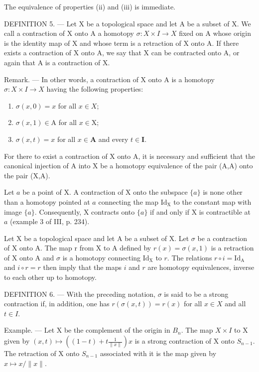 The equivalence of properties (ii) and (iii) is immediate.

DEFINITION 5. --- Let X be a topological space and let A be a subset of X. We call a contraction of X onto A a homotopy \(\sigma\colon X\times I\to X\) fixed on A whose origin is the identity map of X and whose term is a retraction of X onto A. If there exists a contraction of X onto A, we say that X can be contracted onto A, or again that A is a contraction of X.

Remark. --- In other words, a contraction of X onto A is a homotopy \(\sigma\colon X \times I \to X\) having the following properties:

\begin{enumerate}
\def\labelenumi{(\roman{enumi})}
\item
  \(\sigma(x,0)=x\) for all \(x\in X\);
\item
  \(\sigma(x,1)\in\mathrm{A}\) for all \(x\in\mathrm{X}\);
\item
  \(\sigma(x,t)=x\) for all \(x\in\mathbf{A}\) and every \(t\in\mathbf{I}\).
\end{enumerate}

For there to exist a contraction of X onto A, it is necessary and sufficient that the canonical injection of A into X be a homotopy equivalence of the pair (A,A) onto the pair (X,A).

Let \(a\) be a point of X. A contraction of X onto the subspace \(\{a\}\) is none other than a homotopy pointed at \(a\) connecting the map \(\mathrm{Id}_{\mathrm{X}}\) to the constant map with image \(\{a\}\). Consequently, X contracts onto \(\{a\}\) if and only if X is contractible at \(a\) (example 3 of III, p. 234).

Let X be a topological space and let A be a subset of X. Let \(\sigma\) be a contraction of X onto A. The map r from X to A defined by \(r(x) = \sigma(x,1)\) is a retraction of X onto A and \(\sigma\) is a homotopy connecting \(\mathrm{Id}_{\mathrm{X}}\) to \(r\). The relations \(r \circ i = \mathrm{Id}_{\mathrm{A}}\) and \(i \circ r = r\) then imply that the maps \(i\) and \(r\) are homotopy equivalences, inverse to each other up to homotopy.

DEFINITION 6. --- With the preceding notation, \(\sigma\) is said to be a strong contraction if, in addition, one has \(r(\sigma(x,t))=r(x)\) for all \(x\in X\) and all \(t\in I\).

Example. --- Let X be the complement of the origin in \(B_{n}\). The map \(X \times I\) to X given by \((x, t) \mapsto ((1 - t) + t \frac{1}{\|x\|})x\) is a strong contraction of X onto \(S_{n-1}\). The retraction of X onto \(S_{n-1}\) associated with it is the map given by \(x \mapsto x / \|x\|\).


